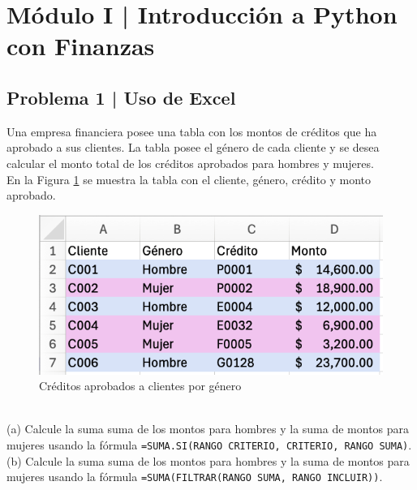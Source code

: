 \documentclass{article}
\begin{document}
\clearpage

\section*{Módulo I | Introducción a Python con Finanzas}

\subsection*{Problema 1 | Uso de Excel}

Una empresa financiera posee una tabla con los montos de créditos que ha aprobado a sus clientes. La tabla posee el género de cada cliente y se desea calcular el monto total de los créditos aprobados para hombres y mujeres.
\\[12pt]
En la Figura \ref{fig:p101-1} se muestra la tabla con el cliente, género, crédito y monto aprobado.
\begin{figure}[!h]
    \centering
    \begin{minipage}{\textwidth}
        \centering
        \includegraphics[width=\textwidth]{figures/p101-1.png}
    \end{minipage}
    \captionsetup{width=0.9\textwidth}
    \caption{Créditos aprobados a clientes por género}
    \label{fig:p101-1}
\end{figure}
\\
(a) Calcule la suma suma de los montos para hombres y la suma de montos para mujeres usando la fórmula \texttt{=SUMA.SI(RANGO CRITERIO, CRITERIO, RANGO SUMA)}.
\\[6pt]
(b) Calcule la suma suma de los montos para hombres y la suma de montos para mujeres usando la fórmula \texttt{=SUMA(FILTRAR(RANGO SUMA, RANGO INCLUIR))}.
\end{document}
